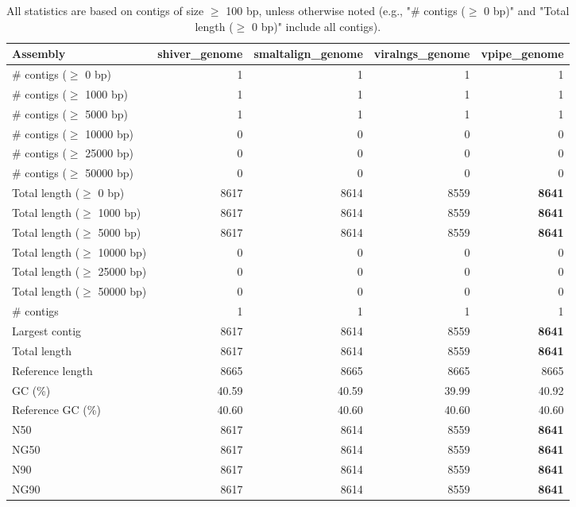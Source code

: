 \documentclass[12pt,a4paper]{article}
\begin{document}
\begin{table}[ht]
\begin{center}
\caption{All statistics are based on contigs of size $\geq$ 100 bp, unless otherwise noted (e.g., "\# contigs ($\geq$ 0 bp)" and "Total length ($\geq$ 0 bp)" include all contigs).}
\begin{tabular}{|l*{4}{|r}|}
\hline
Assembly & shiver\_genome & smaltalign\_genome & viralngs\_genome & vpipe\_genome \\ \hline
\# contigs ($\geq$ 0 bp) & 1 & 1 & 1 & 1 \\ \hline
\# contigs ($\geq$ 1000 bp) & 1 & 1 & 1 & 1 \\ \hline
\# contigs ($\geq$ 5000 bp) & 1 & 1 & 1 & 1 \\ \hline
\# contigs ($\geq$ 10000 bp) & 0 & 0 & 0 & 0 \\ \hline
\# contigs ($\geq$ 25000 bp) & 0 & 0 & 0 & 0 \\ \hline
\# contigs ($\geq$ 50000 bp) & 0 & 0 & 0 & 0 \\ \hline
Total length ($\geq$ 0 bp) & 8617 & 8614 & 8559 & {\bf 8641} \\ \hline
Total length ($\geq$ 1000 bp) & 8617 & 8614 & 8559 & {\bf 8641} \\ \hline
Total length ($\geq$ 5000 bp) & 8617 & 8614 & 8559 & {\bf 8641} \\ \hline
Total length ($\geq$ 10000 bp) & 0 & 0 & 0 & 0 \\ \hline
Total length ($\geq$ 25000 bp) & 0 & 0 & 0 & 0 \\ \hline
Total length ($\geq$ 50000 bp) & 0 & 0 & 0 & 0 \\ \hline
\# contigs & 1 & 1 & 1 & 1 \\ \hline
Largest contig & 8617 & 8614 & 8559 & {\bf 8641} \\ \hline
Total length & 8617 & 8614 & 8559 & {\bf 8641} \\ \hline
Reference length & 8665 & 8665 & 8665 & 8665 \\ \hline
GC (\%) & 40.59 & 40.59 & 39.99 & 40.92 \\ \hline
Reference GC (\%) & 40.60 & 40.60 & 40.60 & 40.60 \\ \hline
N50 & 8617 & 8614 & 8559 & {\bf 8641} \\ \hline
NG50 & 8617 & 8614 & 8559 & {\bf 8641} \\ \hline
N90 & 8617 & 8614 & 8559 & {\bf 8641} \\ \hline
NG90 & 8617 & 8614 & 8559 & {\bf 8641} \\ \hline

\end{tabular}
\end{center}
\end{table}
\end{document}
